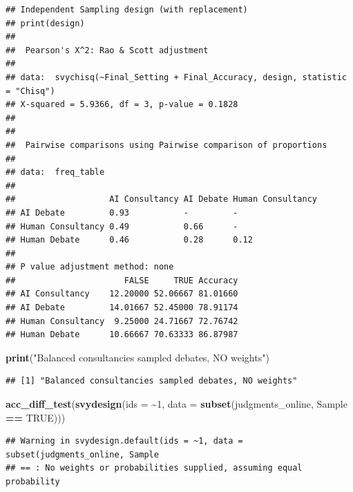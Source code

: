 \documentclass[
]{article}
\newenvironment{Shaded}{\begin{snugshade}}{\end{snugshade}}
\newcommand{\AttributeTok}[1]{\textcolor[rgb]{0.13,0.29,0.53}{#1}}
\newcommand{\ConstantTok}[1]{\textcolor[rgb]{0.56,0.35,0.01}{#1}}
\newcommand{\DecValTok}[1]{\textcolor[rgb]{0.00,0.00,0.81}{#1}}
\newcommand{\FunctionTok}[1]{\textcolor[rgb]{0.13,0.29,0.53}{\textbf{#1}}}
\newcommand{\NormalTok}[1]{#1}
\newcommand{\SpecialCharTok}[1]{\textcolor[rgb]{0.81,0.36,0.00}{\textbf{#1}}}
\newcommand{\StringTok}[1]{\textcolor[rgb]{0.31,0.60,0.02}{#1}}
\begin{document}
\begin{verbatim}
## Independent Sampling design (with replacement)
## print(design)
## 
##  Pearson's X^2: Rao & Scott adjustment
## 
## data:  svychisq(~Final_Setting + Final_Accuracy, design, statistic = "Chisq")
## X-squared = 5.9366, df = 3, p-value = 0.1828
## 
## 
##  Pairwise comparisons using Pairwise comparison of proportions 
## 
## data:  freq_table 
## 
##                   AI Consultancy AI Debate Human Consultancy
## AI Debate         0.93           -         -                
## Human Consultancy 0.49           0.66      -                
## Human Debate      0.46           0.28      0.12             
## 
## P value adjustment method: none 
##                      FALSE     TRUE Accuracy
## AI Consultancy    12.20000 52.06667 81.01660
## AI Debate         14.01667 52.45000 78.91174
## Human Consultancy  9.25000 24.71667 72.76742
## Human Debate      10.66667 70.63333 86.87987
\end{verbatim}

\begin{Shaded}
\begin{Highlighting}[]
\FunctionTok{print}\NormalTok{(}\StringTok{"Balanced consultancies sampled debates, NO weights"}\NormalTok{)}
\end{Highlighting}
\end{Shaded}

\begin{verbatim}
## [1] "Balanced consultancies sampled debates, NO weights"
\end{verbatim}

\begin{Shaded}
\begin{Highlighting}[]
\FunctionTok{acc\_diff\_test}\NormalTok{(}\FunctionTok{svydesign}\NormalTok{(}\AttributeTok{ids =} \SpecialCharTok{\textasciitilde{}}\DecValTok{1}\NormalTok{, }\AttributeTok{data =} \FunctionTok{subset}\NormalTok{(judgments\_online, }\StringTok{\textasciigrave{}}\AttributeTok{Sample}\StringTok{\textasciigrave{}} \SpecialCharTok{==} \ConstantTok{TRUE}\NormalTok{)))}
\end{Highlighting}
\end{Shaded}

\begin{verbatim}
## Warning in svydesign.default(ids = ~1, data = subset(judgments_online, Sample
## == : No weights or probabilities supplied, assuming equal probability
\end{verbatim}
\end{document}
